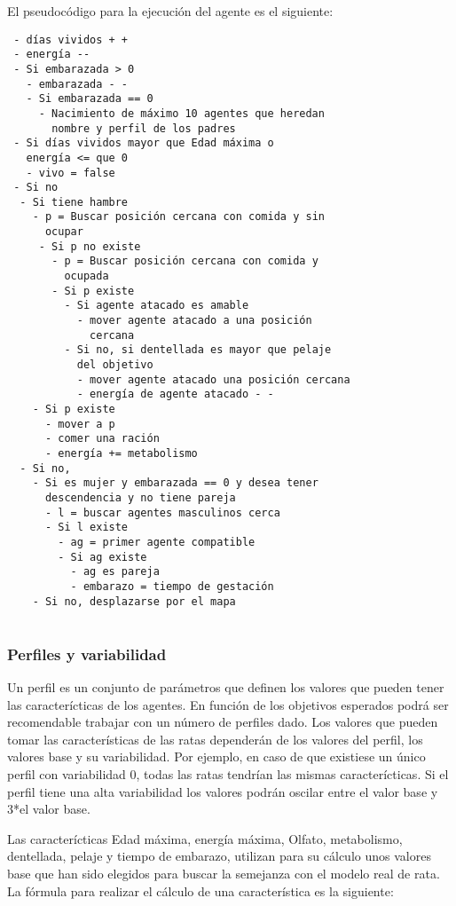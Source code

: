 El pseudocódigo para la ejecución del agente es el siguiente:



\begin{verbatim}
 - días vividos + +
 - energía --
 - Si embarazada > 0
   - embarazada - -
   - Si embarazada == 0
     - Nacimiento de máximo 10 agentes que heredan
       nombre y perfil de los padres
 - Si días vividos mayor que Edad máxima o 
   energía <= que 0
   - vivo = false
 - Si no
  - Si tiene hambre
    - p = Buscar posición cercana con comida y sin 
      ocupar
     - Si p no existe
       - p = Buscar posición cercana con comida y 
         ocupada
       - Si p existe
         - Si agente atacado es amable
           - mover agente atacado a una posición 
             cercana
         - Si no, si dentellada es mayor que pelaje
           del objetivo
           - mover agente atacado una posición cercana
           - energía de agente atacado - - 
    - Si p existe
      - mover a p
      - comer una ración
      - energía += metabolismo
  - Si no, 
    - Si es mujer y embarazada == 0 y desea tener
      descendencia y no tiene pareja
      - l = buscar agentes masculinos cerca
      - Si l existe
        - ag = primer agente compatible
        - Si ag existe
          - ag es pareja
          - embarazo = tiempo de gestación
    - Si no, desplazarse por el mapa
 
\end{verbatim}






\subsubsection{Perfiles y variabilidad}

Un perfil es un conjunto de parámetros que definen los valores que pueden tener
las caracterícticas de los agentes. En función de los objetivos esperados podrá
ser recomendable trabajar con un número de perfiles dado. Los valores que
pueden tomar las características de las ratas dependerán de los valores del
perfil, los valores base y su variabilidad. Por ejemplo, en caso de que
existiese un único perfil con variabilidad 0, todas las ratas tendrían las
mismas caracterícticas. Si el perfil tiene una alta variabilidad los valores
podrán oscilar entre el valor base y 3*el valor base.

Las caracterícticas Edad máxima, energía máxima, Olfato, metabolismo,
dentellada, pelaje y tiempo de embarazo, utilizan para su cálculo unos valores
base que han sido elegidos para buscar la semejanza con el modelo real de rata.
La fórmula para realizar el cálculo de una característica es la siguiente:

